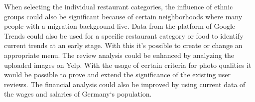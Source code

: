 When selecting the individual restaurant categories, the influence of ethnic groups could also be significant because of certain neighborhoods where many people with a migration background live. Data from the platform of Google Trends could also be used for a specific restaurant category or food to identify current trends at an early stage. With this it's possible to create or change an appropriate menu. \newline
The review analysis could be enhanced by analyzing the uploaded images on Yelp. With the usage of certain criteria for photo qualities it would be possible to prove and extend the significance of the existing user reviews. The financial analysis could also be improved by using current data of the wages and salaries of Germany‘s population.\newline
